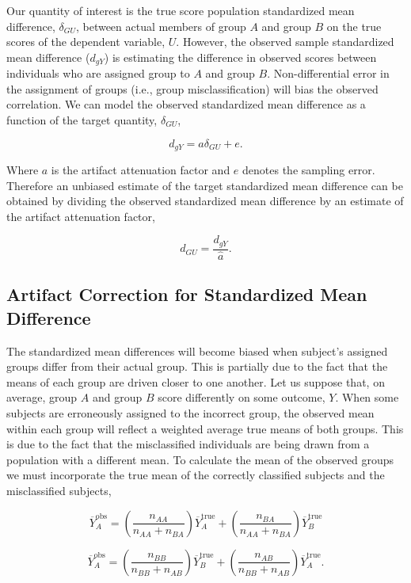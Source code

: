 \documentclass[
  letterpaper,
  DIV=11,
  numbers=noendperiod]{scrreprt}
\begin{document}
Our quantity of interest is the true score population standardized mean
difference, \(\delta_{GU}\), between actual members of group \(A\) and
group \(B\) on the true scores of the dependent variable, \(U\).
However, the observed sample standardized mean difference (\(d_{gY}\))
is estimating the difference in observed scores between individuals who
are assigned group to \(A\) and group \(B\). Non-differential error in
the assignment of groups (i.e., group misclassification) will bias the
observed correlation. We can model the observed standardized mean
difference as a function of the target quantity, \(\delta_{GU}\),

\[
d_{gY} = a\delta_{GU} + e.
\]

Where \(a\) is the artifact attenuation factor and \(e\) denotes the
sampling error. Therefore an unbiased estimate of the target
standardized mean difference can be obtained by dividing the observed
standardized mean difference by an estimate of the artifact attenuation
factor,

\[
d_{GU} = \frac{d_{gY}}{\hat{a}}.
\]

\hypertarget{artifact-correction-for-standardized-mean-difference}{%
\subsection{Artifact Correction for Standardized Mean
Difference}\label{artifact-correction-for-standardized-mean-difference}}

The standardized mean differences will become biased when subject's
assigned groups differ from their actual group. This is partially due to
the fact that the means of each group are driven closer to one another.
Let us suppose that, on average, group \(A\) and group \(B\) score
differently on some outcome, \(Y\). When some subjects are erroneously
assigned to the incorrect group, the observed mean within each group
will reflect a weighted average true means of both groups. This is due
to the fact that the misclassified individuals are being drawn from a
population with a different mean. To calculate the mean of the observed
groups we must incorporate the true mean of the correctly classified
subjects and the misclassified subjects,

\[
\overline{Y}^\text{obs}_A = \left(\frac{n_{AA}}{n_{AA}+n_{BA}}\right)\overline{Y}^\text{true}_A + \left(\frac{n_{BA}}{n_{AA}+n_{BA}}\right)\overline{Y}^\text{true}_B
\]

\[
\overline{Y}^\text{obs}_A = \left(\frac{n_{BB}}{n_{BB}+n_{AB}}\right)\overline{Y}^\text{true}_B + \left(\frac{n_{AB}}{n_{BB}+n_{AB}}\right)\overline{Y}^\text{true}_A.
\]
\end{document}

